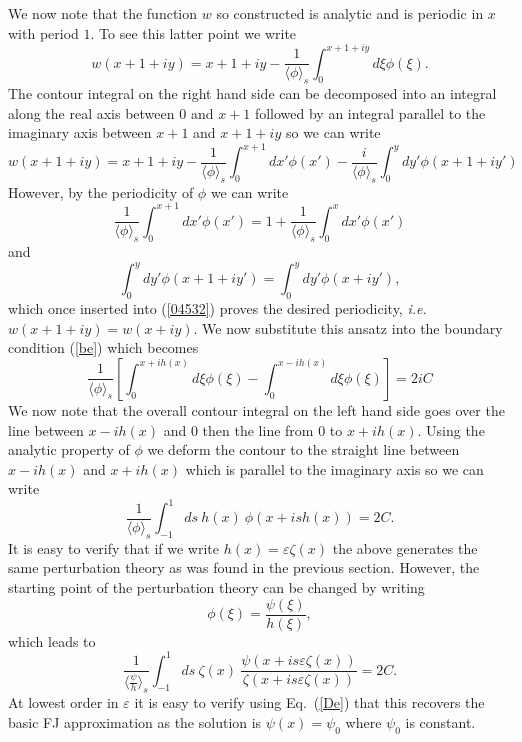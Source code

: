 \documentclass[pre,showpacs,preprintnumbers,amsmath,amssymb,superscriptaddress]{revtex4-1}
\begin{document}
{{We now note that the function $w$ so constructed is analytic and is periodic in $x$ with period $1$. To see this latter point we write
\begin{equation}
w(x+1+iy) = x +1 + iy -\frac{1}{\langle\phi\rangle_s}\int_0^{x+1+iy} d\xi \phi(\xi).\label{04532}
\end{equation}
The contour integral on the right hand side can be decomposed into an integral along 
the real axis between $0$ and $x+1$ followed by an integral parallel to the imaginary axis
between $x+1$ and $x+1+iy$ so we can write 
\begin{equation}
w(x+1+iy) = x +1 + iy -\frac{1}{\langle\phi\rangle_s}\int_0^{x+1} dx'\phi(x')
- \frac{i}{\langle\phi\rangle_s}\int_0^{y} dy' \phi(x+1 + iy')
\end{equation}
However, by the periodicity of $\phi$ we can write
\begin{equation}
\frac{1}{\langle\phi\rangle_s}\int_0^{x+1} dx'\phi(x') = 1 + \frac{1}{\langle\phi\rangle_s}\int_0^{x}
dx'\phi(x')
\end{equation}
and 
\begin{equation}
\int_0^{y} dy' \phi(x+1 + iy') = \int_0^{y} dy' \phi(x + iy'),
\end{equation}
which once inserted into (\ref{04532}) proves the desired periodicity, {\em i.e.} $w(x+1+iy)=w(x+iy)$. We now substitute this ansatz into the boundary condition (\ref{be}) which becomes
\begin{equation}
\frac{1}{\langle \phi\rangle_s}\left[ \int_0^{x+ih(x)} d\xi \phi(\xi) - \int_0^{x-ih(x)} d\xi \phi(\xi)\right] = 2iC\label{eqcomp}
\end{equation}
We now note that the overall contour integral on the left hand side goes over the line between
$x-ih(x)$ and $0$ then the line from $0$ to $x+ih(x)$. Using the analytic property of $\phi$ we deform the contour to the straight line between $x-ih(x)$ and $x+ih(x)$ which is parallel to the imaginary axis so we can write
\begin{equation}
\frac{1}{\langle \phi\rangle_s}\int_{-1}^1 ds \ h(x) \ \phi\left(x + ish(x)\right) = 2C.
\end{equation}
It is easy to verify that if we write $h(x) = \varepsilon\zeta(x)$ the above generates the same 
perturbation theory as was found in the previous section. However, the starting point of the perturbation theory can be changed by writing
\begin{equation}
\phi(\xi) = \frac{\psi(\xi)}{h(\xi)},
\end{equation}
which leads to 
\begin{equation}
\frac{1}{\langle \frac{\psi}{h}\rangle_s}\int_{-1}^1 ds\ \zeta(x) \ \frac{\psi\left(x + is\varepsilon\zeta(x)\right)}{
\zeta\left(x + is\varepsilon\zeta(x)\right)} = 2C.\label{pla1}
\end{equation}
At lowest order in $\varepsilon$ it is easy to verify using Eq.~(\ref{De}) that this recovers the basic FJ approximation as the solution is $\psi(x) = \psi_0$ where $\psi_0$ is constant.

}}
\end{document}
